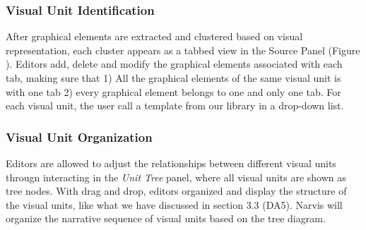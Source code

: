 \subsubsection{Visual Unit Identification} 
After graphical elements are extracted and clustered based on visual representation, each cluster appears as a tabbed view in the Source Panel (Figure ). 
Editors add, delete and modify the graphical elements associated with each tab, making sure that 1) All the graphical elements of the same visual unit is with one tab 2) every graphical element belongs to one and only one tab. For each visual unit, the user call a template from our library in a drop-down list. 

\subsubsection{Visual Unit Organization} 
Editors are allowed to adjust the relationships between different visual units througn interacting in the \textit{Unit Tree} panel, where all visual units are shown as tree nodes.
With drag and drop, editors organized and display the structure of the visual units, like what we have discussed in section 3.3 (DA5). 
Narvis will organize the narrative sequence of visual units based on the tree diagram. 

